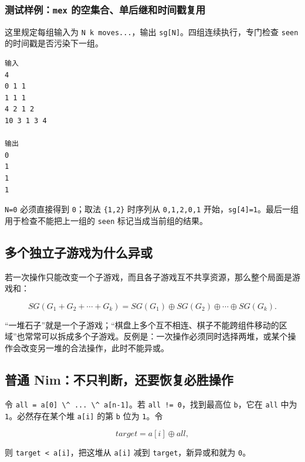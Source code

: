 \subsubsection{\texorpdfstring{测试样例：\texttt{mex} 的空集合、单后继和时间戳复用}{测试样例：mex 的空集合、单后继和时间戳复用}}

这里规定每组输入为 \passthrough{\lstinline!N k moves...!}，输出 \passthrough{\lstinline!sg[N]!}。四组连续执行，专门检查 \passthrough{\lstinline!seen!} 的时间戳是否污染下一组。

\begin{lstlisting}
输入
4
0 1 1
1 1 1
4 2 1 2
10 3 1 3 4

输出
0
1
1
1
\end{lstlisting}

\passthrough{\lstinline!N=0!} 必须直接得到 \passthrough{\lstinline!0!}；取法 \passthrough{\lstinline!\{1,2\}!} 时序列从 \passthrough{\lstinline!0,1,2,0,1!} 开始，\passthrough{\lstinline!sg[4]=1!}。最后一组用于检查不能把上一组的 \passthrough{\lstinline!seen!} 标记当成当前组的结果。


\subsection{多个独立子游戏为什么异或}

若一次操作只能改变一个子游戏，而且各子游戏互不共享资源，那么整个局面是游戏和：

\[SG(G_1+G_2+\cdots+G_k)=SG(G_1)\oplus SG(G_2)\oplus\cdots\oplus SG(G_k).\]

``一堆石子''就是一个子游戏；``棋盘上多个互不相连、棋子不能跨组件移动的区域''也常常可以拆成多个子游戏。反例是：一次操作必须同时选择两堆，或某个操作会改变另一堆的合法操作，此时不能异或。


\subsection{普通 Nim：不只判断，还要恢复必胜操作}

令 \passthrough{\lstinline!all = a[0] \^ ... \^ a[n-1]!}。若 \passthrough{\lstinline"all != 0"}，找到最高位 \passthrough{\lstinline!b!}，它在 \passthrough{\lstinline!all!} 中为 \passthrough{\lstinline!1!}。必然存在某个堆 \passthrough{\lstinline!a[i]!} 的第 \passthrough{\lstinline!b!} 位为 \passthrough{\lstinline!1!}。令

\[target=a[i]\oplus all,\]

则 \passthrough{\lstinline!target < a[i]!}，把这堆从 \passthrough{\lstinline!a[i]!} 减到 \passthrough{\lstinline!target!}，新异或和就为 \passthrough{\lstinline!0!}。

